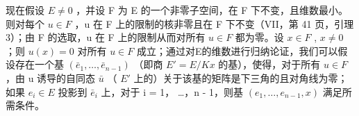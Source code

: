 现在假设 \(E \neq 0\) ，并设 F 为 E 的一个非零子空间，在 F 下不变，且维数最小。则对每个 \(u \in F\) ，u 在 F 上的限制的核非零且在 F 下不变（VII，第 41 页，引理 3）；由 F 的选取，u 在 F 上的限制从而对所有 \(u \in F\) 都为零。设 \(x \in F\) , \(x \neq 0\) ；则 \(u(x) = 0\) 对所有 \(u \in F\) 成立；通过对E的维数进行归纳论证，我们可以假设存在一个基 \((\bar{e}_{1}, \ldots, \bar{e}_{n-1})\) （即商 \(E' = E/Kx\) 的基），使得，对于所有 \(u \in F\) ，由 u 诱导的自同态 \(\bar{u}\) （ \(E'\) 上的）关于该基的矩阵是下三角的且对角线为零；如果 \(e_{i} \in E\) 投影到 \(\bar{e}_{i}\) 上，对于 i = 1， \ldots，n - 1，则基 \((e_{1}, \ldots, e_{n-1}, x)\) 满足所需条件。

